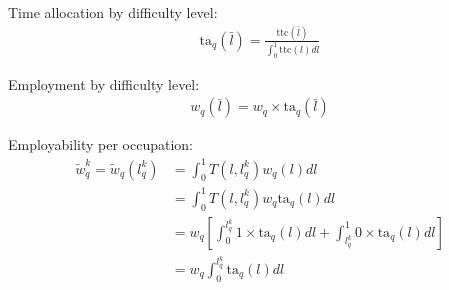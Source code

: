 \documentclass[hidelinks, nonatbib]{elsarticle}
\begin{document}


Time allocation by difficulty level:
\begin{gather}
    \text{ta}_q(\bar{l}) = 
    \frac{
        \text{ttc}(\bar{l})
    }{
        \int_{0}^{1}{
            \text{ttc}(l)
            dl
        }
    }
\end{gather}

Employment by difficulty level:
\begin{gather}
    w_q(\bar{l}) = 
    w_q 
    \times
    \text{ta}_q(\bar{l})
\end{gather}

Employability per occupation:
\begin{align}
    \tilde{w}_{q}^{k} =
    \tilde{w}_q(l_{q}^{k}) &=
    \int_{0}^{1}
    T(l, l_{q}^{k})
    w_q(l)
    dl
    \\
    &=
    \int_{0}^{1}
    T(l, l_{q}^{k})
    w_q 
    \text{ta}_q(l)
    dl
    \\
    &=
    w_q
    \left[
        \int_{0}^{l_{q}^{k}}
            1 \times
            \text{ta}_q(l)
            dl
        + 
        \int_{l_{q}^{k}}^{1}
            0 \times
            \text{ta}_q(l)
            dl
    \right]
    \\
    &=
    w_q
    \int_{0}^{l_{q}^{k}}
    \text{ta}_q(l)
    dl
\end{align}
\end{document}

